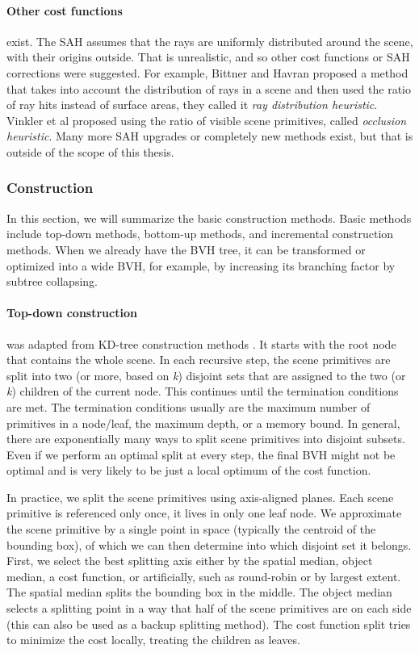 \paragraph{Other cost functions} exist. The SAH assumes that the rays are uniformly distributed around the scene, with their origins outside. That is unrealistic, and so other cost functions or SAH corrections were suggested. For example, Bittner and Havran \cite{BH09} proposed a method that takes into account the distribution of rays in a scene and then used the ratio of ray hits instead of surface areas, they called it \textit{ray distribution heuristic}. Vinkler et al \cite{VHS12} proposed using the ratio of visible scene primitives, called \textit{occlusion heuristic}. Many more SAH upgrades or completely new methods exist, but that is outside of the scope of this thesis.

\subsubsection{Construction}

In this section, we will summarize the basic construction methods. Basic methods include top-down methods, bottom-up methods, and incremental construction methods. When we already have the BVH tree, it can be transformed or optimized into a wide BVH, for example, by increasing its branching factor by subtree collapsing.

\paragraph{Top-down construction} was adapted from KD-tree construction methods \cite{Wal07}. It starts with the root node that contains the whole scene. In each recursive step, the scene primitives are split into two (or more, based on \textit{k}) disjoint sets that are assigned to the two (or \textit{k}) children of the current node. This continues until the termination conditions are met. The termination conditions usually are the maximum number of primitives in a node/leaf, the maximum depth, or a memory bound. In general, there are exponentially many ways to split scene primitives into disjoint subsets. Even if we perform an optimal split at every step, the final BVH might not be optimal and is very likely to be just a local optimum of the cost function. \cite{Meister2021}

In practice, we split the scene primitives using axis-aligned planes. Each scene primitive is referenced only once, it lives in only one leaf node. We approximate the scene primitive by a single point in space (typically the centroid of the bounding box), of which we can then determine into which disjoint set it belongs. First, we select the best splitting axis either by the spatial median, object median, a cost function, or artificially, such as round-robin or by largest extent. The spatial median splits the bounding box in the middle. The object median selects a splitting point in a way that half of the scene primitives are on each side (this can also be used as a backup splitting method). The cost function split tries to minimize the cost locally, treating the children as leaves.

